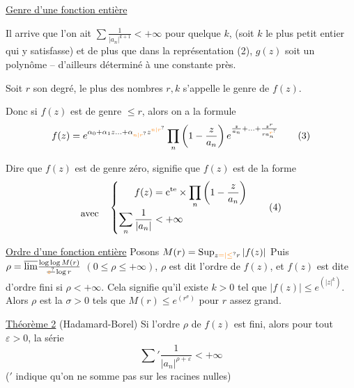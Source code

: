 \uline{Genre d'une fonction entière}

Il arrive que l'on ait $\sum\frac{1}{|a_n|^{k+1}}<+\infty$
pour quelque $k$, (soit $k$ le plus petit entier qui
y satisfasse) et de plus que dans la représentation (2),
$g(z)$ soit un polynôme --
d'ailleurs déterminé à une constante près.

Soit $r$ son degré, le plus   des
nombres $r,k$ s'appelle le genre de $f(z)$.

Donc si $f(z)$ est de genre $\leq r$, alors on
a la formule
\[ f(z)=e^{\alpha_0+\alpha_1 z\ldots+\alpha_{\unsure{n|r}}z^{\unsure{n|r}}}\prod_n\left(1-\frac{z}{a_n}\right)e^{\frac{z}{a_n}+\ldots+\frac{z^r}{r a_n^{\unsure{r}}}}\tag*{(3)} \]

Dire que $f(z)$ est de genre zéro, signifie
que $f(z)$ est de la forme
\[ \begin{aligned} \vphantom{f(z)}\\[-2pt]\text{avec}\quad \end{aligned}\left\{\begin{aligned} f(z)&=\mathrm c^{\mathrm{te}}\times\prod_n\left(1-\frac{z}{a_n}\right)\\[-2pt] \sum_n\frac{1}{|a_n|}&<+\infty \end{aligned}\right. \tag*{(4)} \]

\uline{Ordre d'une fonction entière} \quad Posons $M(r)=\mathop{\rm Sup}_{z\unsure{=|\leq}r}|f(z)|$
Puis $\rho=\overline{\lim}\frac{\log\log M(r)}{\deleted{\unsure{z}}\log r}$ \quad $(0\leq\rho\leq+\infty)$, $\rho$ est
dit l'ordre de $f(z)$, et $f(z)$ est dite d'ordre
fini si $\rho<+\infty$. Cela signifie qu'il existe
$k>0$ tel que $|f(z)|\leq e^{(|z|^k)}$. Alors $\rho$
est la   $\sigma>0$ tels que
  $M(r)\leq e^{(r^\sigma)}$ pour $r$ assez grand.

\uline{Théorème 2} (Hadamard-Borel) Si l'ordre $\rho$ de $f(z)$
est fini, alors pour tout $\varepsilon>0$, la série
\[ \sum{}'\frac{1}{|a_n|^{\rho+\varepsilon}}<+\infty \tag*{(5)} \]
($'$ indique
qu'on ne somme pas sur les racines nulles)

